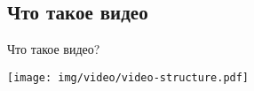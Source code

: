 

\subsection{Что такое видео}

\begin{frame}{Что такое видео?}
    \begin{center}
        \texttt{[image: img/video/video-structure.pdf]}
    \end{center}
\end{frame}
